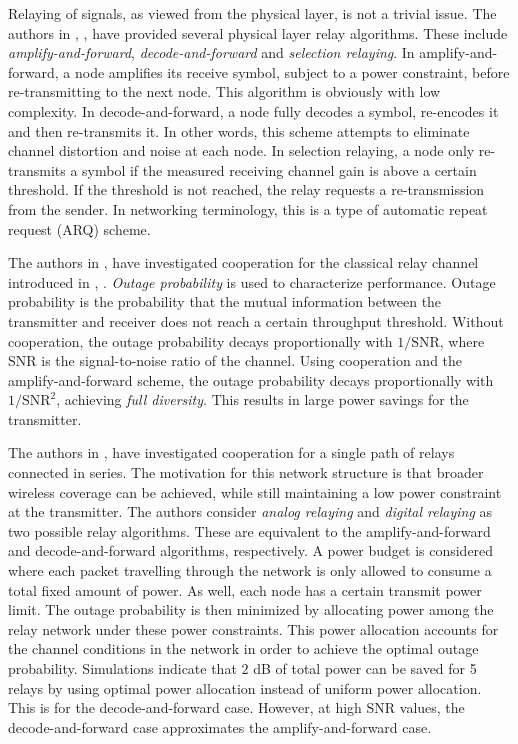 Relaying of signals, as viewed from the physical layer, is not a trivial issue.  The authors in \cite{thesis:Laneman01}, \cite{article:Laneman01}, \cite{article:Laneman02} have provided several physical layer relay algorithms.  These include \emph{amplify-and-forward}, \emph{decode-and-forward} and \emph{selection relaying}.  In amplify-and-forward, a node amplifies its receive symbol, subject to a power constraint, before re-transmitting to the next node.  This algorithm is obviously with low complexity.  In decode-and-forward, a node fully decodes a symbol, re-encodes it and then re-transmits it.  In other words, this scheme attempts to eliminate channel distortion and noise at each node.  In selection relaying, a node only re-transmits a symbol if the measured receiving channel gain is above a certain threshold.  If the threshold is not reached, the relay requests a re-transmission from the sender.  In networking terminology, this is a type of automatic repeat request (ARQ) scheme.

The authors in \cite{article:Laneman01}, \cite{article:Laneman02} have investigated cooperation for the classical relay channel introduced in \cite{book:Cover01}, \cite{article:Laneman02}.  \emph{Outage probability} is used to characterize performance.  Outage probability is the probability that the mutual information between the transmitter and receiver does not reach a certain throughput threshold.  Without cooperation, the outage probability decays proportionally with $1/\mbox{SNR}$, where $\mbox{SNR}$ is the signal-to-noise ratio of the channel.  Using cooperation and the amplify-and-forward scheme, the outage probability decays proportionally with $1/\mbox{SNR}^2$, achieving \emph{full diversity}.  This results in large power savings for the transmitter.

The authors in \cite{article:Hasna02}, \cite{article:Hasna01} have investigated cooperation for a single path of relays connected in series.  The motivation for this network structure is that broader wireless coverage can be achieved, while still maintaining a low power constraint at the transmitter.  The authors consider \emph{analog relaying} and \emph{digital relaying} as two possible relay algorithms.  These are equivalent to the amplify-and-forward and decode-and-forward algorithms, respectively.  A power budget is considered where each packet travelling through the network is only allowed to consume a total fixed amount of power.  As well, each node has a certain transmit power limit.  The outage probability is then minimized by allocating power among the relay network under these power constraints.  This power allocation accounts for the channel conditions in the network in order to achieve the optimal outage probability.  Simulations indicate that $2$ dB of total power can be saved for 5 relays by using optimal power allocation instead of uniform power allocation.  This is for the decode-and-forward case.  However, at high $\mbox{SNR}$ values, the decode-and-forward case approximates the amplify-and-forward case.

